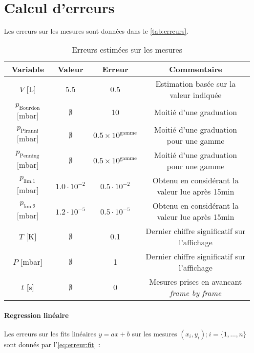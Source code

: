 \section{Calcul d'erreurs}

Les erreurs sur les mesures sont données dans le \autoref{tab:erreurs}.

\begin{table}[h]
    \centering
    \begin{tabulary}{\textwidth}{C C C C}
        \toprule
        Variable & Valeur & Erreur & Commentaire \\
        \midrule
        \(V\) [\unit{\liter}] & 5.5 & 0.5 & Estimation basée sur la valeur indiquée \\
        \(p_\textrm{Bourdon}\) [\unit{\milli\bar}] & \(\emptyset\) & 10 & Moitié d'une graduation \\
        \(p_\textrm{Piranni}\) [\unit{\milli\bar}] & \(\emptyset\) & \(0.5 \times 10^\textrm{gamme}\) & Moitié d'une graduation pour une gamme \\
        \(p_\textrm{Penning}\) [\unit{\milli\bar}] & \(\emptyset\) & \(0.5 \times 10^\textrm{gamme}\) & Moitié d'une graduation pour une gamme \\
        \(p_\textrm{lim,1}\) [\unit{\milli\bar}] & \(1.0 \cdot 10^{-2}\) & \(0.5 \cdot 10^{-2}\) & Obtenu en considérant la valeur lue après 15min \\
        \(p_\textrm{lim,2}\) [\unit{\milli\bar}] & \(1.2 \cdot 10^{-5}\) & \(0.5 \cdot 10^{-5}\) & Obtenu en considérant la valeur lue après 15min \\
        \midrule
        \(T\) [\unit{\kelvin}] & \(\emptyset\) & 0.1 & Dernier chiffre significatif sur l'affichage \\
        \(P\) [\unit{\milli\bar}] & \(\emptyset\) & 1 & Dernier chiffre significatif sur l'affichage \\
        \(t\) [\unit{\second}] & \(\emptyset\) & 0 & Mesures prises en avancant \textit{frame by frame} \\
        \bottomrule
    \end{tabulary}
    \caption{Erreurs estimées sur les mesures}
    \label{tab:erreurs}
\end{table}

\paragraph*{Regression linéaire}
Les erreurs sur les fits linéaires \(y = ax + b\) sur les mesures \((x_i, y_i) ; i = \{1, \hdots, n\}\) sont donnés par l'\autoref{eq:erreur:fit} \cite{erreursmesure}:

